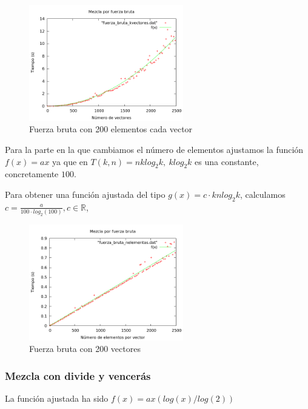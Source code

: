 \begin{figure}[htb] 
\centering
	\includegraphics[width=0.6\textwidth]{../Obligatorio/Graficas/fuerza_bruta_kvectores.png}
	\caption{Fuerza bruta con 200 elementos cada vector} 
	\label{fig:f_kvectores} 
\end{figure}

\newpage
Para la parte en la que cambiamos el n\'umero de elementos ajustamos la funci\'on 
$f(x) = ax$ ya 	que en $T(k, n) = nklog_2k, \ klog_2k$ es una constante, concretamente $100$.

\begin{center}
\end{center}

Para obtener una funci\'on ajustada del tipo $g(x)=c\cdot knlog_2k$, calculamos $c=\frac{a}{100\cdot log_2(100)}, c \in \mathbb{R}$,

\begin{figure}[htb] 
\centering
	\includegraphics[width=0.6\textwidth]{../Obligatorio/Graficas/fuerza_bruta_nelementos.png}
	\caption{Fuerza bruta con 200 vectores} 
	\label{fig:f_nelementos} 
\end{figure}
\newpage


\subsubsection{Mezcla con divide y vencer\'as}
La funci\'on ajustada ha sido $f(x) = ax(log(x)/log(2))$

